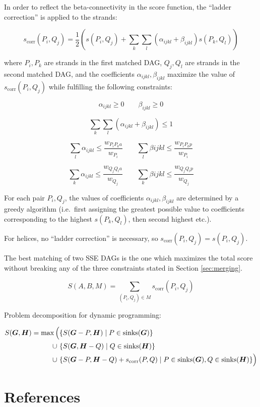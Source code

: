 \documentclass{article}
\begin{document}
In order to reflect the beta-connectivity in the score function, 
the ``ladder correction'' is applied to the strands:

\[  s_\mathrm{corr}(P_i, Q_j) = \frac{1}{2} \left( s(P_i, Q_j) + \sum_k \sum_l (\alpha_{ijkl} + \beta_{ijkl}) s(P_k, Q_l) \right)  \]

where \(P_i, P_k\) are strands in the first matched DAG, 
\(Q_j, Q_l\) are strands in the second matched DAG, 
and the coefficients \(\alpha_{ijkl}, \beta_{ijkl}\) 
maximize the value of \(s_\mathrm{corr}(P_i, Q_j)\)
while fulfilling the following constraints:

\[  \alpha_{ijkl} \geq 0 \qquad  \beta_{ijkl} \geq 0  \]

\[  \sum_k \sum_l (\alpha_{ijkl} + \beta_{ijkl}) \leq 1  \]

\[  \sum_l \alpha_{ijkl} \leq \frac{w_{P_i P_k a}}{w_{P_i}}  \qquad  \sum_l \beta{ijkl} \leq \frac{w_{P_i P_k p}}{w_{P_i}}  \]

\[  \sum_k \alpha_{ijkl} \leq \frac{w_{Q_j Q_l a}}{w_{Q_j}}  \qquad  \sum_k \beta{ijkl} \leq \frac{w_{Q_j Q_l p}}{w_{Q_j}}  \]

For each pair \(P_i, Q_j\), the values of coefficients \(\alpha_{ijkl}, \beta_{ijkl}\) 
are determined by a greedy algorithm (i.e.~first assigning the greatest possible value 
to coefficients corresponding to the highest \(s(P_k, Q_l)\), then second highest etc.). 

For helices, no ``ladder correction'' is necessary, so \(s_\mathrm{corr}(P_i, Q_j) = s(P_i, Q_j)\).

The best matching of two SSE DAGs is the one which maximizes the total score without breaking any of the three constraints stated in Section \ref{sec:merging}.

\[  S(A, B, M) = \sum_{(P_i, Q_j) \in M} s_\mathrm{corr}(P_i, Q_j)  \]

Problem decomposition for dynamic programming:

\[ \begin{aligned}
  S(\boldsymbol{G}, \boldsymbol{H}) = \max\Big( & \{ S(\boldsymbol{G}-P, \boldsymbol{H}) \mid P \in \mathrm{sinks}(\boldsymbol{G}) \} \\
                            \cup\     & \{ S(\boldsymbol{G}, \boldsymbol{H}-Q) \mid Q \in \mathrm{sinks}(\boldsymbol{H}) \} \\
                            \cup\     & \{ S(\boldsymbol{G}-P, \boldsymbol{H}-Q) + s_\mathrm{corr}(P, Q) \mid P \in \mathrm{sinks}(\boldsymbol{G}), Q \in \mathrm{sinks}(\boldsymbol{H}) \} \Big)  
\end{aligned} \]




\section{References}

\TODO{}
\end{document}
